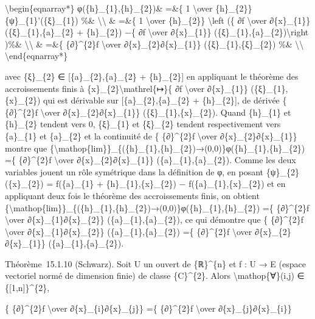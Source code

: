 \textbackslash{}begin\{eqnarray*\} φ(\{h\}\_\{1\},\{h\}\_\{2\})\& =\&\{
1 \textbackslash{}over \{h\}\_\{2\}\} \{ψ\}\_\{1\}'(\{ξ\}\_\{1\}) \%\&
\textbackslash{}\textbackslash{} \& =\&\{ 1 \textbackslash{}over
\{h\}\_\{2\}\} \textbackslash{}left (\{ ∂f \textbackslash{}over
∂\{x\}\_\{1\}\} (\{ξ\}\_\{1\},\{a\}\_\{2\} + \{h\}\_\{2\}) −\{ ∂f
\textbackslash{}over ∂\{x\}\_\{1\}\}
(\{ξ\}\_\{1\},\{a\}\_\{2\})\textbackslash{}right )\%\&
\textbackslash{}\textbackslash{} \& =\&\{ \{∂\}\^{}\{2\}f
\textbackslash{}over ∂\{x\}\_\{2\}∂\{x\}\_\{1\}\}
(\{ξ\}\_\{1\},\{ξ\}\_\{2\}) \%\& \textbackslash{}\textbackslash{}
\textbackslash{}end\{eqnarray*\}

avec \{ξ\}\_\{2\} ∈ {[}\{a\}\_\{2\},\{a\}\_\{2\} + \{h\}\_\{2\}{]} en
appliquant le théorème des accroissements finis à
\{x\}\_\{2\}\textbackslash{}mathrel\{↦\}\{ ∂f \textbackslash{}over
∂\{x\}\_\{1\}\} (\{ξ\}\_\{1\},\{x\}\_\{2\}) qui est dérivable sur
{[}\{a\}\_\{2\},\{a\}\_\{2\} + \{h\}\_\{2\}{]}, de dérivée \{
\{∂\}\^{}\{2\}f \textbackslash{}over ∂\{x\}\_\{2\}∂\{x\}\_\{1\}\}
(\{ξ\}\_\{1\},\{x\}\_\{2\}). Quand \{h\}\_\{1\} et \{h\}\_\{2\} tendent
vers 0, \{ξ\}\_\{1\} et \{ξ\}\_\{2\} tendent respectivement vers
\{a\}\_\{1\} et \{a\}\_\{2\} et la continuité de \{ \{∂\}\^{}\{2\}f
\textbackslash{}over ∂\{x\}\_\{2\}∂\{x\}\_\{1\}\} montre que
\{\textbackslash{}mathop\{lim\}\}\_\{(\{h\}\_\{1\},\{h\}\_\{2\})→(0,0)\}φ(\{h\}\_\{1\},\{h\}\_\{2\})
=\{ \{∂\}\^{}\{2\}f \textbackslash{}over ∂\{x\}\_\{2\}∂\{x\}\_\{1\}\}
(\{a\}\_\{1\},\{a\}\_\{2\}). Comme les deux variables jouent un rôle
symétrique dans la définition de φ, en posant \{ψ\}\_\{2\}(\{x\}\_\{2\})
= f(\{a\}\_\{1\} + \{h\}\_\{1\},\{x\}\_\{2\}) −
f(\{a\}\_\{1\},\{x\}\_\{2\}) et en appliquant deux fois le théorème des
accroissements finis, on obtient
\{\textbackslash{}mathop\{lim\}\}\_\{(\{h\}\_\{1\},\{h\}\_\{2\})→(0,0)\}φ(\{h\}\_\{1\},\{h\}\_\{2\})
=\{ \{∂\}\^{}\{2\}f \textbackslash{}over ∂\{x\}\_\{1\}∂\{x\}\_\{2\}\}
(\{a\}\_\{1\},\{a\}\_\{2\}), ce qui démontre que \{ \{∂\}\^{}\{2\}f
\textbackslash{}over ∂\{x\}\_\{1\}∂\{x\}\_\{2\}\}
(\{a\}\_\{1\},\{a\}\_\{2\}) =\{ \{∂\}\^{}\{2\}f \textbackslash{}over
∂\{x\}\_\{2\}∂\{x\}\_\{1\}\} (\{a\}\_\{1\},\{a\}\_\{2\}).

Théorème~15.1.10 (Schwarz). Soit U un ouvert de \{ℝ\}\^{}\{n\} et f : U
→ E (espace vectoriel normé de dimension finie) de classe
\{C\}\^{}\{2\}. Alors \textbackslash{}mathop\{∀\}(i,j) ∈
\{{[}1,n{]}\}\^{}\{2\},

\{ \{∂\}\^{}\{2\}f \textbackslash{}over ∂\{x\}\_\{i\}∂\{x\}\_\{j\}\} =\{
\{∂\}\^{}\{2\}f \textbackslash{}over ∂\{x\}\_\{j\}∂\{x\}\_\{i\}\}

